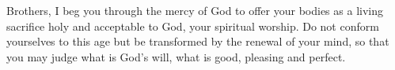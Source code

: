 
\lettrine{B}{}rothers, I beg you through the mercy of God to offer your bodies as a living sacrifice holy and acceptable to God, your spiritual worship. Do not conform yourselves to this age but be transformed by the renewal of your mind, so that you may judge what is God’s will, what is good, pleasing and perfect.